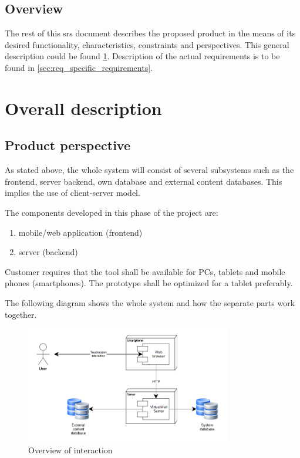 \documentclass[11pt]{book}
\begin{document}
\subsection{Overview}
The rest of this \gls{srs} document describes the proposed product in the means of its desired functionality, characteristics, constraints and perspectives. This general description could be found \ref{sec:req_overall_description}. Description of the actual requirements is to be found in \ref{sec:req_specific_requirements}.

\section{Overall description}\label{sec:req_overall_description}
\subsection{Product perspective}
As stated above, the whole system will consist of several subsystems such as the frontend, server backend, own database and external content databases. This implies the use of client-server model.

The components developed in this phase of the project are:

\begin{enumerate}
  \item mobile/web application (frontend)
  \item server (backend)
\end{enumerate}

Customer requires that the tool shall be available for PCs, tablets and mobile phones (smartphones). The prototype shall be optimized for a tablet preferably.

The following diagram shows the whole system and how the separate parts work together.

\begin{figure}[H]
      \centering
      \includegraphics[width=0.8\textwidth]{Figures/Requirements/overview.png}
      \caption{Overview of interaction}
      \label{fig:req_overview}
\end{figure}
\end{document}
